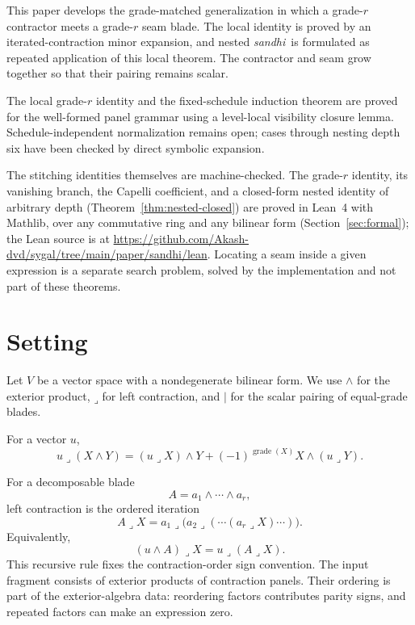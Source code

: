 \documentclass[11pt]{article}
\newcommand{\sandhi}{\textit{sandhi}}
\begin{document}
This paper develops the grade-matched generalization in which a grade-\(r\)
contractor meets a grade-\(r\) seam blade. The local identity is proved by an
iterated-contraction minor expansion, and nested \sandhi\ is formulated as
repeated application of this local theorem. The contractor and seam grow
together so that their pairing remains scalar.

The local grade-\(r\) identity and the fixed-schedule induction theorem are
proved for the well-formed panel grammar using a level-local visibility closure
lemma. Schedule-independent normalization remains open; cases through
nesting depth six have been checked by direct symbolic expansion.

The stitching identities themselves are machine-checked. The grade-\(r\)
identity, its vanishing branch, the Capelli coefficient, and a closed-form
nested identity of arbitrary depth (Theorem~\ref{thm:nested-closed}) are
proved in Lean~4 with Mathlib, over any commutative ring and any bilinear
form (Section~\ref{sec:formal}); the Lean source is at
\url{https://github.com/Akash-dvd/sygal/tree/main/paper/sandhi/lean}. Locating a seam inside a given expression is
a separate search problem, solved by the implementation and not part of these
theorems.

\section{Setting}

Let \(V\) be a vector space with a nondegenerate bilinear form. We use
\(\wedge\) for the exterior product, \(\mathbin{\lrcorner}\) for left
contraction, and \(\mid\) for the scalar pairing of equal-grade blades.

For a vector \(u\),
\[
u\mathbin{\lrcorner}(X\wedge Y)
 =(u\mathbin{\lrcorner}X)\wedge Y
 +(-1)^{\operatorname{grade}(X)}
   X\wedge(u\mathbin{\lrcorner}Y).
\]

For a decomposable blade
\[
A=a_1\wedge\cdots\wedge a_r,
\]
left contraction is the ordered iteration
\[
A\mathbin{\lrcorner}X
 =
a_1\mathbin{\lrcorner}\bigl(
a_2\mathbin{\lrcorner}(\cdots
(a_r\mathbin{\lrcorner}X)\cdots)\bigr).
\]
Equivalently,
\[
(u\wedge A)\mathbin{\lrcorner}X
 =u\mathbin{\lrcorner}(A\mathbin{\lrcorner}X).
\]
This recursive rule fixes the contraction-order sign convention.
The input fragment consists of exterior products of contraction panels. Their
ordering is part of the exterior-algebra data: reordering factors contributes
parity signs, and repeated factors can make an expression zero.
\end{document}
